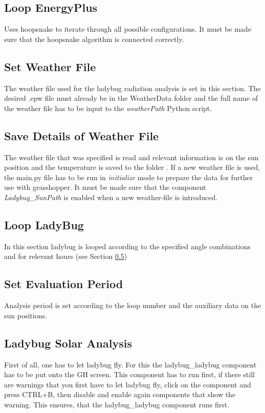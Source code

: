 	\subsection{Loop EnergyPlus}
	Uses hoopsnake to iterate through all possible configurations. It must be made sure that the hoopsnake algorithm is connected correctly.

	\subsection{Set Weather File}
	The weather file used for the ladybug radiation analysis is set in this section. The desired .epw file must already be in the WeatherData folder and the full name of the weather file has to be input to the \emph{weatherPath} Python script. 

	\subsection{Save Details of Weather File}
	The weather file that was specified is read and relevant information is on the sun position and the temperature is saved to the folder . If a new weather file is used, the main.py file has to be run in \emph{initialize} mode to prepare the data for further use with grasshopper. It must be made sure that the component \emph{Ladybug\_SunPath} is enabled when a new weather-file is introduced. 


	\subsection{Loop LadyBug}
	In this section ladybug is looped according to the specified angle combinations and for relevant hours (see Section \ref{ss:setEvalPeriod})

	\subsection{Set Evaluation Period}
	\label{ss:setEvalPeriod}
	Analysis period is set according to the loop number and the auxiliary data on the sun positions. 

	\subsection{Ladybug Solar Analysis}
	First of all, one has to let ladybug fly. For this the ladybug\_ladybug component has to be put onto the GH screen. This component has to run first, if there still are warnings that you first have to let ladybug fly, click on the component and press CTRL+B, then disable and enable again components that show the warning. This ensures, that the ladybug\_ladybug component runs first. 

